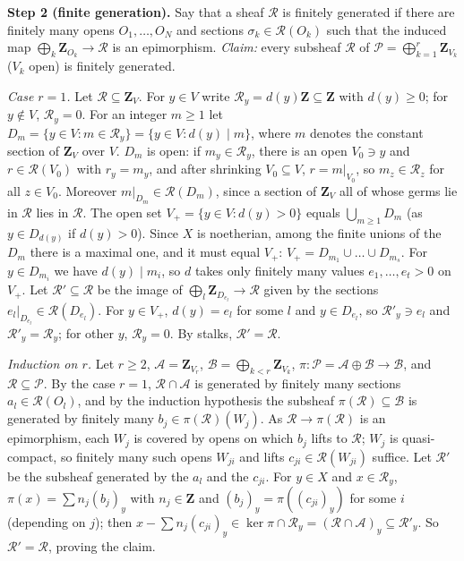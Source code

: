 \documentclass[11pt]{article}
\begin{document}
\textbf{Step 2 (finite generation).} Say that a sheaf $\mathcal R$ is finitely generated if there are finitely many opens $O_1,\dots,O_N$ and sections $\sigma_k\in\mathcal R(O_k)$ such that the induced map $\bigoplus_k\mathbf Z_{O_k}\to\mathcal R$ is an epimorphism. \emph{Claim:} every subsheaf $\mathcal R$ of $\mathcal P=\bigoplus_{k=1}^r\mathbf Z_{V_k}$ ($V_k$ open) is finitely generated.

\emph{Case $r=1$.} Let $\mathcal R\subseteq\mathbf Z_V$. For $y\in V$ write $\mathcal R_y=d(y)\mathbf Z\subseteq\mathbf Z$ with $d(y)\ge0$; for $y\notin V$, $\mathcal R_y=0$. For an integer $m\ge1$ let $D_m=\{y\in V:m\in\mathcal R_y\}=\{y\in V:d(y)\mid m\}$, where $m$ denotes the constant section of $\mathbf Z_V$ over $V$. $D_m$ is open: if $m_y\in\mathcal R_y$, there is an open $V_0\ni y$ and $r\in\mathcal R(V_0)$ with $r_y=m_y$, and after shrinking $V_0\subseteq V$, $r=m|_{V_0}$, so $m_z\in\mathcal R_z$ for all $z\in V_0$. Moreover $m|_{D_m}\in\mathcal R(D_m)$, since a section of $\mathbf Z_V$ all of whose germs lie in $\mathcal R$ lies in $\mathcal R$. The open set $V_+=\{y\in V:d(y)>0\}$ equals $\bigcup_{m\ge1}D_m$ (as $y\in D_{d(y)}$ if $d(y)>0$). Since $X$ is noetherian, among the finite unions of the $D_m$ there is a maximal one, and it must equal $V_+$: $V_+=D_{m_1}\cup\dots\cup D_{m_s}$. For $y\in D_{m_i}$ we have $d(y)\mid m_i$, so $d$ takes only finitely many values $e_1,\dots,e_t>0$ on $V_+$. Let $\mathcal R'\subseteq\mathcal R$ be the image of $\bigoplus_l\mathbf Z_{D_{e_l}}\to\mathcal R$ given by the sections $e_l|_{D_{e_l}}\in\mathcal R(D_{e_l})$. For $y\in V_+$, $d(y)=e_l$ for some $l$ and $y\in D_{e_l}$, so $\mathcal R'_y\ni e_l$ and $\mathcal R'_y=\mathcal R_y$; for other $y$, $\mathcal R_y=0$. By stalks, $\mathcal R'=\mathcal R$.

\emph{Induction on $r$.} Let $r\ge2$, $\mathcal A=\mathbf Z_{V_r}$, $\mathcal B=\bigoplus_{k<r}\mathbf Z_{V_k}$, $\pi:\mathcal P=\mathcal A\oplus\mathcal B\to\mathcal B$, and $\mathcal R\subseteq\mathcal P$. By the case $r=1$, $\mathcal R\cap\mathcal A$ is generated by finitely many sections $a_l\in\mathcal R(O_l)$, and by the induction hypothesis the subsheaf $\pi(\mathcal R)\subseteq\mathcal B$ is generated by finitely many $b_j\in\pi(\mathcal R)(W_j)$. As $\mathcal R\to\pi(\mathcal R)$ is an epimorphism, each $W_j$ is covered by opens on which $b_j$ lifts to $\mathcal R$; $W_j$ is quasi-compact, so finitely many such opens $W_{ji}$ and lifts $c_{ji}\in\mathcal R(W_{ji})$ suffice. Let $\mathcal R'$ be the subsheaf generated by the $a_l$ and the $c_{ji}$. For $y\in X$ and $x\in\mathcal R_y$, $\pi(x)=\sum n_j(b_j)_y$ with $n_j\in\mathbf Z$ and $(b_j)_y=\pi((c_{ji})_y)$ for some $i$ (depending on $j$); then $x-\sum n_j(c_{ji})_y\in\ker\pi\cap\mathcal R_y=(\mathcal R\cap\mathcal A)_y\subseteq\mathcal R'_y$. So $\mathcal R'=\mathcal R$, proving the claim.
\end{document}
